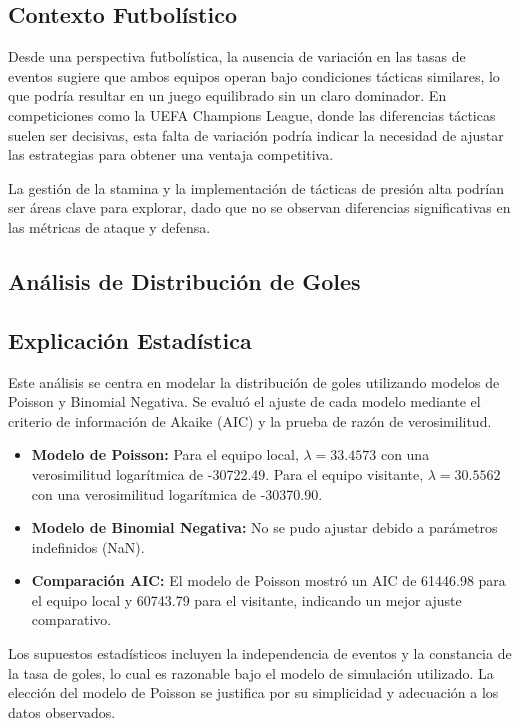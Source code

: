 \documentclass{article}
\begin{document}
        \subsection*{Contexto Futbolístico}
        Desde una perspectiva futbolística, la ausencia de variación en las tasas de eventos sugiere que ambos equipos operan bajo condiciones tácticas similares, lo que podría resultar en un juego equilibrado sin un claro dominador. En competiciones como la UEFA Champions League, donde las diferencias tácticas suelen ser decisivas, esta falta de variación podría indicar la necesidad de ajustar las estrategias para obtener una ventaja competitiva.
        
        La gestión de la stamina y la implementación de tácticas de presión alta podrían ser áreas clave para explorar, dado que no se observan diferencias significativas en las métricas de ataque y defensa.
        
        \subsection{Análisis de Distribución de Goles}
            \subsection*{Explicación Estadística}
            Este análisis se centra en modelar la distribución de goles utilizando modelos de Poisson y Binomial Negativa. Se evaluó el ajuste de cada modelo mediante el criterio de información de Akaike (AIC) y la prueba de razón de verosimilitud.

            \begin{itemize}
                \item \textbf{Modelo de Poisson:} Para el equipo local, $\lambda = 33.4573$ con una verosimilitud logarítmica de -30722.49. Para el equipo visitante, $\lambda = 30.5562$ con una verosimilitud logarítmica de -30370.90.
                \item \textbf{Modelo de Binomial Negativa:} No se pudo ajustar debido a parámetros indefinidos (NaN).
                \item \textbf{Comparación AIC:} El modelo de Poisson mostró un AIC de 61446.98 para el equipo local y 60743.79 para el visitante, indicando un mejor ajuste comparativo.
            \end{itemize}

            Los supuestos estadísticos incluyen la independencia de eventos y la constancia de la tasa de goles, lo cual es razonable bajo el modelo de simulación utilizado. La elección del modelo de Poisson se justifica por su simplicidad y adecuación a los datos observados.
\end{document}
